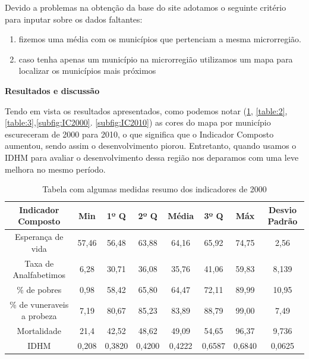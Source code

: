 \documentclass[11pt,a4paper]{article}
\begin{document}
Devido a problemas na obtenção da base do site \cite{atlas} adotamos o seguinte critério para inputar sobre os dados faltantes:
\begin{enumerate}[label=(\roman*)]
\item fizemos uma média com os municípios que pertenciam a mesma microrregião. 
\item caso tenha apenas um município na microrregião utilizamos um mapa para localizar os municípios mais próximos
\end{enumerate}

\textbf{Resultados e discussão}

Tendo em vista os resultados apresentados, como podemos notar (\ref{table:1}, \ref{table:2}, \ref{table:3},\ref{subfig:IC2000}. \ref{subfig:IC2010}) as cores do mapa por município escureceram de 2000 para 2010, o que significa que o Indicador Composto aumentou, sendo assim o desenvolvimento piorou. Entretanto, quando usamos o IDHM para avaliar o desenvolvimento dessa região nos deparamos com uma leve melhora no mesmo período.
\vspace{-.4cm}
\begin{table}[h!]
  \begin{center}
      \caption{Tabela com algumas medidas resumo dos indicadores de 2000}
    \begin{tabular}{c|c|c|c|c|c|c|c}
    \hline
      \textbf{Indicador Composto} & \textbf{Min} & \textbf{1º Q} & \textbf{2º Q} & \textbf{Média} & \textbf{3º Q} & \textbf{Máx}  & \textbf{Desvio Padrão} \\
      \hline
      Esperança de vida & 57,46 & 56,48 & 63,88 & 64,16 & 65,92 & 74,75 & 2,56\\
      Taxa de Analfabetimos & 6,28 & 30,71 & 36,08 & 35,76 & 41,06 & 59,83 & 8,139\\
      \% de pobres & 0,98 & 58,42 & 65,80 & 64,47 & 72,11 & 89,99 & 10,95\\ 
      \% de vuneraveis a probeza & 7,19 & 80,67 & 85,23 & 83,89 & 88,79 & 99,00 & 7,49 \\ 
      Mortalidade & 21,4 & 42,52 & 48,62 & 49,09 & 54,65 & 96,37 &  9,736\\ 
      IDHM & 0,208 & 0,3820 & 0,4200 & 0,4222 & 0,6587 & 0,6840 & 0,0625 \\
      \hline
    \end{tabular}
     \label{table:1}
  \end{center}
\end{table}
\vspace{-1cm}
\end{document}
